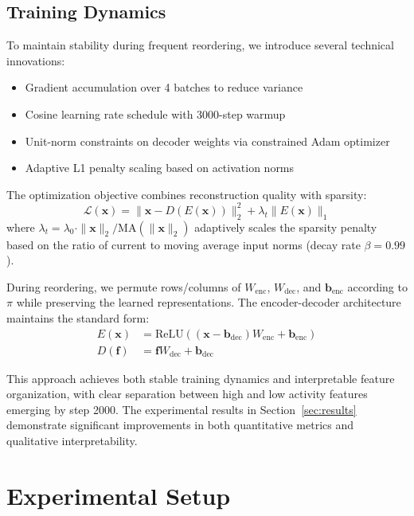 \documentclass{article} %
\begin{document}
\subsection{Training Dynamics}
To maintain stability during frequent reordering, we introduce several technical innovations:

\begin{itemize}
    \item Gradient accumulation over 4 batches to reduce variance
    \item Cosine learning rate schedule with 3000-step warmup
    \item Unit-norm constraints on decoder weights via constrained Adam optimizer
    \item Adaptive L1 penalty scaling based on activation norms
\end{itemize}

The optimization objective combines reconstruction quality with sparsity:
\begin{equation}
    \mathcal{L}(\mathbf{x}) = \|\mathbf{x} - D(E(\mathbf{x}))\|_2^2 + \lambda_t\|E(\mathbf{x})\|_1
\end{equation}
where $\lambda_t = \lambda_0 \cdot \|\mathbf{x}\|_2 / \text{MA}(\|\mathbf{x}\|_2)$ adaptively scales the sparsity penalty based on the ratio of current to moving average input norms (decay rate $\beta=0.99$).

During reordering, we permute rows/columns of $W_{\text{enc}}$, $W_{\text{dec}}$, and $\mathbf{b}_{\text{enc}}$ according to $\pi$ while preserving the learned representations. The encoder-decoder architecture maintains the standard form:
\begin{align}
    E(\mathbf{x}) &= \text{ReLU}((\mathbf{x} - \mathbf{b}_{\text{dec}})W_{\text{enc}} + \mathbf{b}_{\text{enc}}) \\
    D(\mathbf{f}) &= \mathbf{f}W_{\text{dec}} + \mathbf{b}_{\text{dec}}
\end{align}

This approach achieves both stable training dynamics and interpretable feature organization, with clear separation between high and low activity features emerging by step 2000. The experimental results in Section~\ref{sec:results} demonstrate significant improvements in both quantitative metrics and qualitative interpretability.

\section{Experimental Setup}
\label{sec:experimental}
\end{document}
